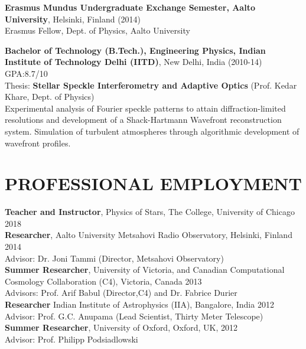 \documentclass[margin]{res}
\begin{document}
\begin{resume}
\textbf{Erasmus Mundus Undergraduate Exchange Semester, Aalto University}, Helsinki, Finland (2014)\\
Erasmus Fellow, Dept. of Physics, Aalto University

\textbf{Bachelor of Technology (B.Tech.), Engineering Physics, Indian Institute of Technology Delhi (IITD)}, New Delhi, India (2010-14) \hfill GPA:8.7/10\\
Thesis: \textbf{Stellar Speckle Interferometry and Adaptive Optics} (Prof. Kedar Khare, Dept. of Physics)\\
Experimental analysis of Fourier speckle patterns to attain diffraction-limited resolutions and development of a Shack-Hartmann Wavefront reconstruction system. Simulation of turbulent atmospheres through algorithmic development of wavefront profiles.

\section{PROFESSIONAL EMPLOYMENT}

\textbf{Teacher and Instructor}, Physics of Stars, The College, University of Chicago \hfill 2018 \\
\textbf{Researcher}, Aalto University Metsahovi Radio Observatory, Helsinki, Finland \hfill 2014\\
Advisor: Dr. Joni Tammi (Director, Metsahovi Observatory)\\
\textbf{Summer Researcher}, University of Victoria, and Canadian Computational Cosmology Collaboration (C4), Victoria, Canada \hfill 2013\\
Advisors: Prof. Arif Babul (Director,C4) and Dr. Fabrice Durier\\
\textbf{Researcher} Indian Institute of Astrophysics (IIA), Bangalore, India \hfill 2012\\
Advisor: Prof. G.C. Anupama (Lead Scientist, Thirty Meter Telescope)\\
\textbf{Summer Researcher}, University of Oxford, Oxford, UK, \hfill 2012\\
Advisor: Prof. Philipp Podsiadlowski


\end{resume}
\end{document}
